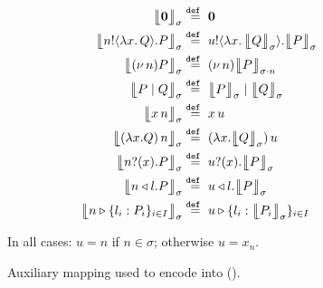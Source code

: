 \begin{figure}[t!]
	\begin{align*}
		\auxmapp{\inact}{{}}{\sigma}  & \defeq  \inact
		\\
		\auxmapp{\bout{n}{\abs{x}{Q}} P}{{}}{\sigma} & \defeq \bout{u}{\abs{x}{\auxmapp{Q}{{}}{\sigma}}} \auxmapp{P}{{}}{\sigma}
		\\
		\auxmapp{\news{n} P}{{}}{\sigma} & \defeq \news{n} \auxmapp{P}{{}}{{\sigma \cat n}}
		\\
		\auxmapp{P \Par Q}{{}}{\sigma} & \defeq \auxmapp{P}{{}}{\sigma} \Par \auxmapp{Q}{{}}{\sigma} 
		\\
		\auxmapp{\appl{x}{n}}{{}}{\sigma} & \defeq \appl{x}{u}
		\\
		\auxmapp{\appl{(\lambda x.Q)}{n}}{{}}{\sigma}  & \defeq \appl{(\lambda x.\auxmapp{Q}{{}}{\sigma})}{u}
		\\
		\auxmapp{\binp{n}{x} P}{{}}{\sigma} & \defeq \binp{u}{x} \auxmapp{P}{{}}{\sigma} 
		\\
		\auxmapp{\bsel{n}{l} P}{{}}{\sigma} & \defeq \bsel{u}{l} \auxmapp{P}{{}}{\sigma} 
		\\
		\auxmapp{\bbra{n}{l_i:P_i}_{i \in I}}{{}}{\sigma} & \defeq \bbra{u}{l_i:\auxmapp{P_i}{{}}{\sigma}}_{i \in I}
\end{align*}
\begin{center}
	{In all cases: $u = n$ if $n\in \sigma$; otherwise $u = x_n$.}
\end{center}
\caption{\label{f:auxmap} Auxiliary mapping used to encode \HOp into \HO ().}
\end{figure}

